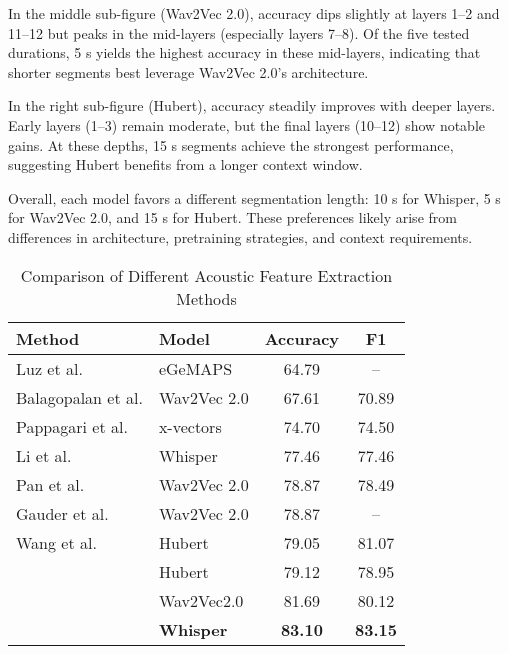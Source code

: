 \documentclass[journal]{IEEEtran}
\begin{document}
In the middle sub-figure (Wav2Vec 2.0), accuracy dips slightly at layers 1–2 and 11–12 but peaks in the mid-layers (especially layers 7–8). Of the five tested durations, 5 s yields the highest accuracy in these mid-layers, indicating that shorter segments best leverage Wav2Vec 2.0’s architecture.

In the right sub-figure (Hubert), accuracy steadily improves with deeper layers. Early layers (1–3) remain moderate, but the final layers (10–12) show notable gains. At these depths, 15 s segments achieve the strongest performance, suggesting Hubert benefits from a longer context window.

Overall, each model favors a different segmentation length: 10 s for Whisper, 5 s for Wav2Vec 2.0, and 15 s for Hubert. These preferences likely arise from differences in architecture, pretraining strategies, and context requirements.











\begin{table}[ht]
\centering
\caption{Comparison of Different Acoustic Feature Extraction Methods}
\label{tab:comparison}
\small
\setlength{\tabcolsep}{3pt} 
\begin{tabular}{>{\centering}p{} >{\centering}p{} cc}
\toprule
\textbf{Method} & \textbf{Model} & \textbf{Accuracy} & \textbf{F1} \\
\midrule
Luz et al.\cite{adresso} & eGeMAPS & 64.79 & -- \\
Balagopalan et al.\cite{w2v-segement-average2} & Wav2Vec 2.0 & 67.61 & 70.89 \\
Pappagari et al.\cite{Pappagari} & x-vectors & 74.70 & 74.50 \\
Li et al.\cite{Whisper-fullASR} & Whisper & 77.46 & 77.46 \\
Pan et al.\cite{pan} & Wav2Vec 2.0 & 78.87 & 78.49 \\
Gauder et al.\cite{segment-w2v} & Wav2Vec 2.0 & 78.87 & -- \\
Wang et al.\cite{wang} & Hubert & 79.05 & 81.07 \\
\midrule 
\multirow{3}{*}{\textbf{Proposed}} 
& Hubert& 79.12 & 78.95 \\
& Wav2Vec2.0& 81.69 & 80.12 \\
& \textbf{Whisper} & \textbf{83.10} & \textbf{83.15} \\
\bottomrule
\end{tabular}
\end{table}
\end{document}
